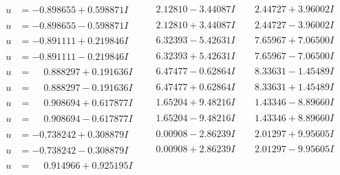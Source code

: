 \documentclass[1p]{elsarticle_modified}
\theoremstyle{definition}
\begin{document}
$$\begin{array}{c|c|c}
\begin{aligned}
u &= -0.898655 + 0.598871 I\end{aligned}
 & \phantom{-}2.12810 - 3.44087 I & \phantom{-}2.44727 + 3.96002 I \\ \hline\begin{aligned}
u &= -0.898655 - 0.598871 I\end{aligned}
 & \phantom{-}2.12810 + 3.44087 I & \phantom{-}2.44727 - 3.96002 I \\ \hline\begin{aligned}
u &= -0.891111 + 0.219846 I\end{aligned}
 & \phantom{-}6.32393 - 5.42631 I & \phantom{-}7.65967 + 7.06500 I \\ \hline\begin{aligned}
u &= -0.891111 - 0.219846 I\end{aligned}
 & \phantom{-}6.32393 + 5.42631 I & \phantom{-}7.65967 - 7.06500 I \\ \hline\begin{aligned}
u &= \phantom{-}0.888297 + 0.191636 I\end{aligned}
 & \phantom{-}6.47477 - 0.62864 I & \phantom{-}8.33631 - 1.45489 I \\ \hline\begin{aligned}
u &= \phantom{-}0.888297 - 0.191636 I\end{aligned}
 & \phantom{-}6.47477 + 0.62864 I & \phantom{-}8.33631 + 1.45489 I \\ \hline\begin{aligned}
u &= \phantom{-}0.908694 + 0.617877 I\end{aligned}
 & \phantom{-}1.65204 + 9.48216 I & \phantom{-}1.43346 - 8.89660 I \\ \hline\begin{aligned}
u &= \phantom{-}0.908694 - 0.617877 I\end{aligned}
 & \phantom{-}1.65204 - 9.48216 I & \phantom{-}1.43346 + 8.89660 I \\ \hline\begin{aligned}
u &= -0.738242 + 0.308879 I\end{aligned}
 & \phantom{-}0.00908 - 2.86239 I & \phantom{-}2.01297 + 9.95605 I \\ \hline\begin{aligned}
u &= -0.738242 - 0.308879 I\end{aligned}
 & \phantom{-}0.00908 + 2.86239 I & \phantom{-}2.01297 - 9.95605 I \\ \hline\begin{aligned}
u &= \phantom{-}0.914966 + 0.925195 I\end{aligned}

\end{array}$$
\end{document}

